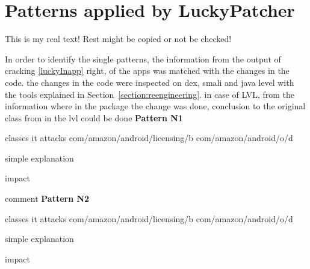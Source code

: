 \section{Patterns applied by LuckyPatcher} \label{section:luckypatcher-patterns}
This is my real text! Rest might be copied or not be checked!

In order to identify the single patterns, the information from the output of cracking \ref{luckyInapp} right, of the apps was matched with the changes in the code. the changes in the code were inspected on dex, smali and java level with the tools explained in Section~\ref{section:reengineering}. in case of LVL, from the information where in the package the change was done, conclusion to the original class from in the lvl could be done
\newline
\newline
\textbf{Pattern N1} \newline

classes it attacks
com/amazon/android/licensing/b
com/amazon/android/o/d



simple explanation

impact

comment
\newline
\newline
\textbf{Pattern N2} \newline

classes it attacks
com/amazon/android/licensing/b
com/amazon/android/o/d



simple explanation

impact

